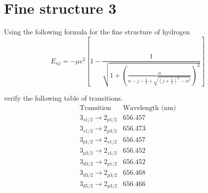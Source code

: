 

\section*{Fine structure 3}

Using the following formula for the fine structure of hydrogen
\begin{equation*}
E_{nj}=-\mu c^2\left[1-\frac{1}{\sqrt{\displaystyle1
+\left(\frac{\alpha}{n-j-\frac{1}{2}+\sqrt{\left(j+\frac{1}{2}\right)^2-\alpha^2}}\right)^2}}\right]
\end{equation*}

verify the following table of transitions.
\begin{equation*}
\begin{matrix}
\text{Transition} & \text{Wavelength (nm)}
\\[1ex]
3_{s1/2}\rightarrow2_{p1/2} & 656.457
\\
3_{s1/2}\rightarrow2_{p3/2} & 656.473
\\[1ex]
3_{p1/2}\rightarrow2_{s1/2} & 656.457
\\
3_{p3/2}\rightarrow2_{s1/2} & 656.452
\\[1ex]
3_{d3/2}\rightarrow2_{p1/2} & 656.452
\\
3_{d3/2}\rightarrow2_{p3/2} & 656.468
\\
3_{d5/2}\rightarrow2_{p3/2} & 656.466
\end{matrix}
\end{equation*}


